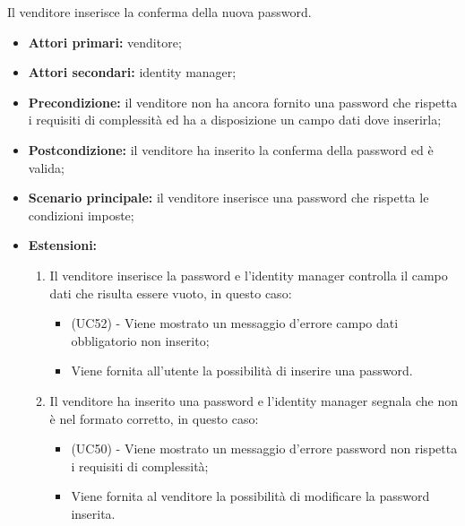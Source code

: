 Il venditore inserisce la conferma della nuova password.
\begin{itemize}
	\item \textbf{Attori primari:} venditore;
	\item \textbf{Attori secondari:} identity manager;
	\item \textbf{Precondizione:} il venditore non ha ancora fornito una password che rispetta i requisiti di complessità ed ha a disposizione un campo dati dove inserirla;
	\item \textbf{Postcondizione:} il venditore ha inserito la conferma della password ed è valida;
	\item \textbf{Scenario principale:} il venditore inserisce una password che rispetta le condizioni imposte;
	\item \textbf{Estensioni:}
	\begin{enumerate}[label=\lett]
		\item Il venditore inserisce la password e l'identity manager controlla il campo dati che risulta essere vuoto, in questo caso:
		\begin{itemize}
			\item (UC52) - Viene mostrato un messaggio d'errore campo dati obbligatorio non inserito;
			\item Viene fornita all'utente la possibilità di inserire una password.
		\end{itemize}
		\item Il venditore ha inserito una password e l'identity manager segnala che non è nel formato corretto, in questo caso:
		\begin{itemize}
			\item (UC50) - Viene mostrato un messaggio d'errore password non rispetta i requisiti di complessità;
			\item Viene fornita al venditore la possibilità di modificare la password inserita.
		\end{itemize}
	\end{enumerate} 
\end{itemize}

